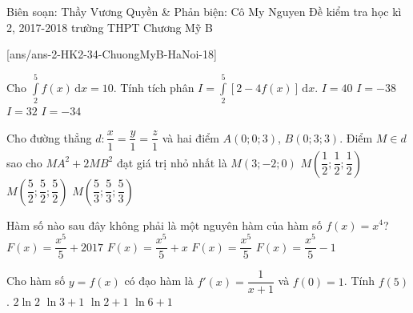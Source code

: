 
\begin{name}
{Biên soạn: Thầy Vương Quyền \& Phản biện: Cô My Nguyen}
{Đề kiểm tra học kì 2, 2017-2018 trường THPT Chương Mỹ B}
\end{name}
\setcounter{ex}{0}\setcounter{bt}{0}
[ans/ans-2-HK2-34-ChuongMyB-HaNoi-18]
\begin{ex}%
Cho $\displaystyle\int\limits_{2}^{5} f(x)\mathrm{\,d}x =10$. Tính tích phân $I=\displaystyle\int\limits_{2}^{5} \left[2-4f(x)\right]\mathrm{\,d}x$.
\choice
{$I=40$}
{$I=-38$}
{$I=32$}
{\True $I=-34$}
\end{ex}

\begin{ex}%
Cho đường thẳng $d\colon\dfrac{x}{1}=\dfrac{y}{1}=\dfrac{z}{1}$ và hai điểm $A(0;0;3)$, $B(0;3;3)$. Điểm $M\in d$ sao cho $MA^2+2MB^2$ đạt giá trị nhỏ nhất là
\choice
{$M(3;-2;0)$}
{$M\left(\dfrac{1}{2};\dfrac{1}{2};\dfrac{1}{2}\right)$}
{$M\left(\dfrac{5}{2};\dfrac{5}{2};\dfrac{5}{2}\right)$}
{\True $M\left(\dfrac{5}{3};\dfrac{5}{3};\dfrac{5}{3}\right)$}
\end{ex}

\begin{ex}%
Hàm số nào sau đây không phải là một nguyên hàm của hàm số $f(x)=x^4$?
\choice
{$F(x)=\dfrac{x^5}{5}+2017$}
{\True $F(x)=\dfrac{x^5}{5}+x$}
{$F(x)=\dfrac{x^5}{5}$}
{$F(x)=\dfrac{x^5}{5}-1$}
\end{ex}

\begin{ex}%
Cho hàm số $y=f(x)$ có đạo hàm là $f'(x)=\dfrac{1}{x+1}$ và $f(0)=1$. Tính $f(5)$.
\choice
{$2\ln 2$}
{$\ln 3+1$}
{$\ln 2+1$}
{\True $\ln 6+1$}
\end{ex}

